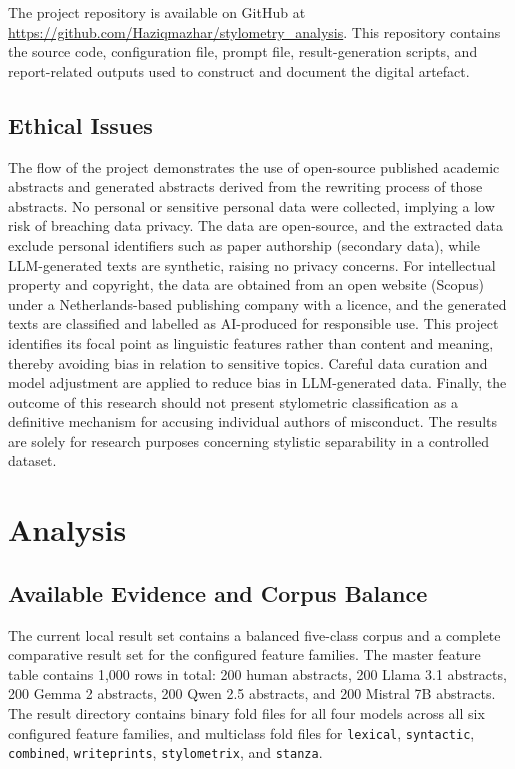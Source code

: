 \documentclass[12pt,a4paper]{article}
\begin{document}
The project repository is available on GitHub at \url{https://github.com/Haziqmazhar/stylometry_analysis}. This repository contains the source code, configuration file, prompt file, result-generation scripts, and report-related outputs used to construct and document the digital artefact.

\subsection{Ethical Issues}

The flow of the project demonstrates the use of open-source published academic abstracts and generated abstracts derived from the rewriting process of those abstracts. No personal or sensitive personal data were collected, implying a low risk of breaching data privacy. The data are open-source, and the extracted data exclude personal identifiers such as paper authorship (secondary data), while LLM-generated texts are synthetic, raising no privacy concerns. For intellectual property and copyright, the data are obtained from an open website (Scopus) under a Netherlands-based publishing company with a licence, and the generated texts are classified and labelled as AI-produced for responsible use. This project identifies its focal point as linguistic features rather than content and meaning, thereby avoiding bias in relation to sensitive topics. Careful data curation and model adjustment are applied to reduce bias in LLM-generated data. Finally, the outcome of this research should not present stylometric classification as a definitive mechanism for accusing individual authors of misconduct. The results are solely for research purposes concerning stylistic separability in a controlled dataset.

\section{Analysis}

\subsection{Available Evidence and Corpus Balance}

The current local result set contains a balanced five-class corpus and a complete comparative result set for the configured feature families. The master feature table contains 1,000 rows in total: 200 human abstracts, 200 Llama 3.1 abstracts, 200 Gemma 2 abstracts, 200 Qwen 2.5 abstracts, and 200 Mistral 7B abstracts. The result directory contains binary fold files for all four models across all six configured feature families, and multiclass fold files for \texttt{lexical}, \texttt{syntactic}, \texttt{combined}, \texttt{writeprints}, \texttt{stylometrix}, and \texttt{stanza}.
\end{document}
